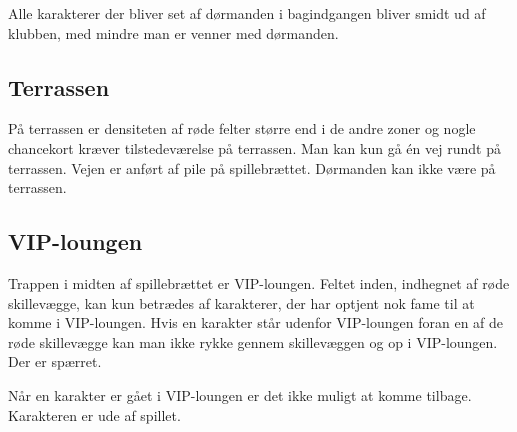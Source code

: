 Alle karakterer der bliver set af dørmanden i bagindgangen bliver smidt ud af klubben, med mindre man er venner med dørmanden.

\subsection{Terrassen}
På terrassen er densiteten af røde felter større end i de andre zoner og nogle chancekort kræver tilstedeværelse på terrassen. Man kan kun gå én vej rundt på terrassen. Vejen er anført af pile på spillebrættet. Dørmanden kan ikke være på terrassen. 

\subsection{VIP-loungen}  
Trappen i midten af spillebrættet er VIP-loungen. Feltet inden, indhegnet af røde skillevægge, kan kun betrædes af karakterer, der har optjent nok fame til at komme i VIP-loungen. Hvis en karakter står udenfor VIP-loungen foran en af de røde skillevægge kan man ikke rykke gennem skillevæggen og op i VIP-loungen. Der er spærret.

Når en karakter er gået i VIP-loungen er det ikke muligt at komme tilbage. Karakteren er ude af spillet.  